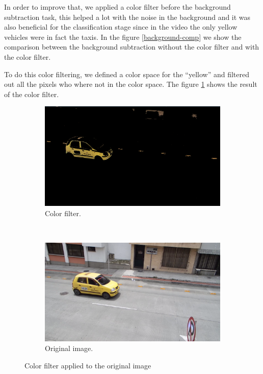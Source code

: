 \documentclass[journal]{IEEEtran}
\begin{document}
In order to improve that, we applied a color filter before the background
subtraction task, this helped a lot with the noise in the background and it was
also beneficial for the classification stage since in the video the only yellow
vehicles were in fact the taxis. In the figure \ref{background-comp} we show
the comparison between the background subtraction without the color filter
and with the color filter.

To do this color filtering, we defined a color space for the ``yellow'' and
filtered out all the pixels who where not in the color space. The figure
\ref{color-filter} shows the result of the color filter.


\begin{figure}
  \centering
  \begin{subfigure}[b]{0.2\textwidth}
  \includegraphics[scale=0.09]{../img/yellow}
  \caption{Color filter.}
  \end{subfigure}
  ~ %
  \begin{subfigure}[b]{0.2\textwidth}
  \includegraphics[scale=0.09]{../img/original}
  \caption{Original image.}
  \end{subfigure}
  \caption{Color filter applied to the original image}
  \label{color-filter}
\end{figure}
\end{document}
